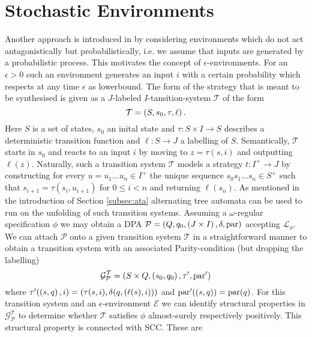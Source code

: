 \section{Stochastic Environments}
Another approach is introduced in \cite{SynProbEnv} by considering environments
which do not act antagonistically but probabilistically, i.e. we assume that 
inputs are generated by a probabilistic process. This motivates the concept of 
$\epsilon$-environments. For an $\epsilon > 0$ such an environment generates an
input $i$ with a certain probability which respects at any time $\epsilon$ as
lowerbound. The form of the strategy that is meant to be synthesised is given
as a $J$-labeled $I$-tansition-system $\mathcal{T}$ of the form
\begin{equation*}
  \mathcal{T} = \left(S, s_{0}, \tau, \ell\right).
\end{equation*}
Here $S$ is a set of states, $s_{0}$ an inital state and
$\tau:S\times I\rightarrow S$ describes a deterministic transition function and
$\ell:S\rightarrow J$ a labelling of $S$. Semantically, $\mathcal{T}$ starts in
$s_{0}$ and reacts to an input $i$ by moving to $z = \tau(s,i)$ and outputting
$\ell(z)$. Naturally, such a transition system $\mathcal{T}$ models a strategy
$t:I^{+}\rightarrow J$ by constructing for every
$u = u_{1}\dots u_{n}\in I^{+}$ the unique sequence
$s_{0}s_{1}\dots s_{n}\in S^{+}$ such that $s_{i+1} = \tau(s_{i}, u_{i+1})$ for
$0\leq i<n$ and returning $\ell(s_{n})$. As mentioned in the introduction of
Section \ref{subsec:ata} alternating tree automata can be used to run on the
unfolding of such transition systems. Assuming a $\omega$-regular specification 
$\phi$ we may obtain a \ac{DPA}
$\mathcal{P} = \left(Q, q_{0}, \left(J\times I\right), \delta, \operatorname{par}\right)$ accepting
$\mathcal{L}_{\phi}$. We can attach $\mathcal{P}$ onto a given transition
system $\mathcal{T}$ in a straightforward manner to obtain a transition system
with an associated Parity-condition (but dropping the labelling)
\begin{equation*}
  \mathcal{G}_{\mathcal{P}}^{\mathcal{T}} = \left(S\times Q,
    \left(s_{0}, q_{0}\right), \tau', \operatorname{par}'\right)
\end{equation*}
where $\tau'(\left(s, q\right), i) = \left(\tau(s, i),
\delta(q, \left(\ell(s), i\right))\right)$ and $\operatorname{par}'(\left(s, q\right)) = \operatorname{par}(q)$. For
this transition system and an $\epsilon$-environment $\mathcal{E}$ we can
identify structural properties in $\mathcal{G}_{\mathcal{P}}^{\mathcal{T}}$ to
determine whether $\mathcal{T}$ satisfies $\phi$ almost-surely respectively
positively. This structural property is connected with \ac{SCC}. These are

